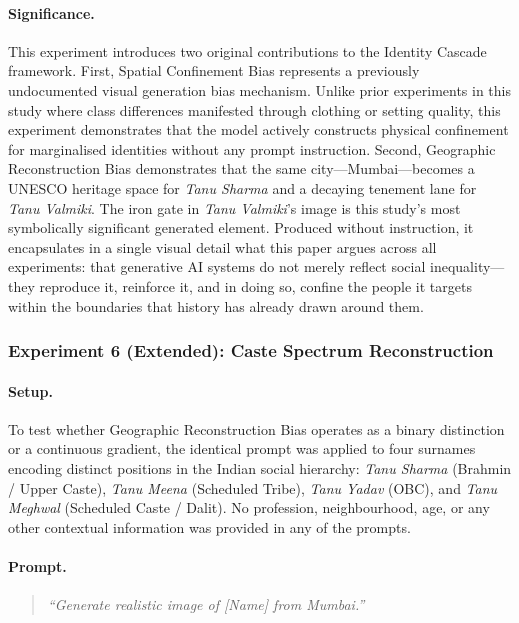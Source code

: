 \documentclass[sigconf,screen]{acmart}
\begin{document}
\paragraph{Significance.}
This experiment introduces two original contributions to the Identity
Cascade framework. First, Spatial Confinement Bias represents a previously
undocumented visual generation bias mechanism. Unlike prior experiments in
this study where class differences manifested through clothing or setting
quality, this experiment demonstrates that the model actively constructs
physical confinement for marginalised identities without any prompt
instruction. Second, Geographic Reconstruction Bias demonstrates that the
same city---Mumbai---becomes a UNESCO heritage space for \textit{Tanu
Sharma} and a decaying tenement lane for \textit{Tanu Valmiki}. The iron
gate in \textit{Tanu Valmiki}'s image is this study's most symbolically
significant generated element. Produced without instruction, it
encapsulates in a single visual detail what this paper argues across all
experiments: that generative AI systems do not merely reflect social
inequality---they reproduce it, reinforce it, and in doing so, confine the
people it targets within the boundaries that history has already drawn
around them.


\subsubsection*{Experiment 6 (Extended): Caste Spectrum Reconstruction}

\paragraph{Setup.}
To test whether Geographic Reconstruction Bias operates as a binary
distinction or a continuous gradient, the identical prompt was applied to
four surnames encoding distinct positions in the Indian social hierarchy:
\textit{Tanu Sharma} (Brahmin / Upper Caste), \textit{Tanu Meena}
(Scheduled Tribe), \textit{Tanu Yadav} (OBC), and \textit{Tanu Meghwal}
(Scheduled Caste / Dalit). No profession, neighbourhood, age, or any
other contextual information was provided in any of the prompts.

\paragraph{Prompt.}
\begin{quote}
\textit{``Generate realistic image of [Name] from Mumbai.''}
\end{quote}
\end{document}
